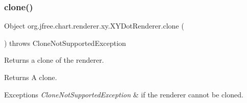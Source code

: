 \subsubsection{\texorpdfstring{clone()}{clone()}}
{\footnotesize\ttfamily Object org.\+jfree.\+chart.\+renderer.\+xy.\+X\+Y\+Dot\+Renderer.\+clone (\begin{DoxyParamCaption}{ }\end{DoxyParamCaption}) throws Clone\+Not\+Supported\+Exception}

Returns a clone of the renderer.

\begin{DoxyReturn}{Returns}
A clone.
\end{DoxyReturn}

\begin{DoxyExceptions}{Exceptions}
{\em Clone\+Not\+Supported\+Exception} & if the renderer cannot be cloned. \\
\hline
\end{DoxyExceptions}
\mbox{\label{classorg_1_1jfree_1_1chart_1_1renderer_1_1xy_1_1_x_y_dot_renderer_a7e5f2af6bd02f506a5def497674c579d}} 
